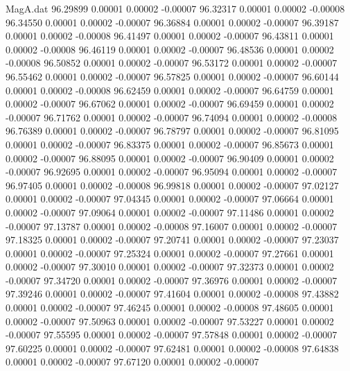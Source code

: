 \begin{filecontents}{MagA.dat}
  96.29899    0.00001    0.00002   -0.00007
  96.32317    0.00001    0.00002   -0.00008
  96.34550    0.00001    0.00002   -0.00007
  96.36884    0.00001    0.00002   -0.00007
  96.39187    0.00001    0.00002   -0.00008
  96.41497    0.00001    0.00002   -0.00007
  96.43811    0.00001    0.00002   -0.00008
  96.46119    0.00001    0.00002   -0.00007
  96.48536    0.00001    0.00002   -0.00008
  96.50852    0.00001    0.00002   -0.00007
  96.53172    0.00001    0.00002   -0.00007
  96.55462    0.00001    0.00002   -0.00007
  96.57825    0.00001    0.00002   -0.00007
  96.60144    0.00001    0.00002   -0.00008
  96.62459    0.00001    0.00002   -0.00007
  96.64759    0.00001    0.00002   -0.00007
  96.67062    0.00001    0.00002   -0.00007
  96.69459    0.00001    0.00002   -0.00007
  96.71762    0.00001    0.00002   -0.00007
  96.74094    0.00001    0.00002   -0.00008
  96.76389    0.00001    0.00002   -0.00007
  96.78797    0.00001    0.00002   -0.00007
  96.81095    0.00001    0.00002   -0.00007
  96.83375    0.00001    0.00002   -0.00007
  96.85673    0.00001    0.00002   -0.00007
  96.88095    0.00001    0.00002   -0.00007
  96.90409    0.00001    0.00002   -0.00007
  96.92695    0.00001    0.00002   -0.00007
  96.95094    0.00001    0.00002   -0.00007
  96.97405    0.00001    0.00002   -0.00008
  96.99818    0.00001    0.00002   -0.00007
  97.02127    0.00001    0.00002   -0.00007
  97.04345    0.00001    0.00002   -0.00007
  97.06664    0.00001    0.00002   -0.00007
  97.09064    0.00001    0.00002   -0.00007
  97.11486    0.00001    0.00002   -0.00007
  97.13787    0.00001    0.00002   -0.00008
  97.16007    0.00001    0.00002   -0.00007
  97.18325    0.00001    0.00002   -0.00007
  97.20741    0.00001    0.00002   -0.00007
  97.23037    0.00001    0.00002   -0.00007
  97.25324    0.00001    0.00002   -0.00007
  97.27661    0.00001    0.00002   -0.00007
  97.30010    0.00001    0.00002   -0.00007
  97.32373    0.00001    0.00002   -0.00007
  97.34720    0.00001    0.00002   -0.00007
  97.36976    0.00001    0.00002   -0.00007
  97.39246    0.00001    0.00002   -0.00007
  97.41604    0.00001    0.00002   -0.00008
  97.43882    0.00001    0.00002   -0.00007
  97.46245    0.00001    0.00002   -0.00008
  97.48605    0.00001    0.00002   -0.00007
  97.50963    0.00001    0.00002   -0.00007
  97.53227    0.00001    0.00002   -0.00007
  97.55595    0.00001    0.00002   -0.00007
  97.57848    0.00001    0.00002   -0.00007
  97.60225    0.00001    0.00002   -0.00007
  97.62481    0.00001    0.00002   -0.00008
  97.64838    0.00001    0.00002   -0.00007
  97.67120    0.00001    0.00002   -0.00007

\end{filecontents}
